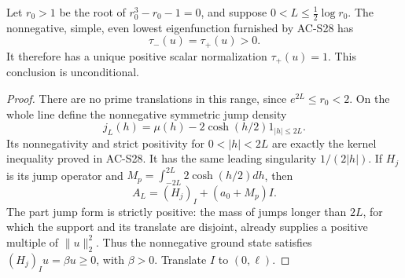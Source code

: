 \begin{proposition}
\label{AC-S38}
Let \(r_0>1\) be the root of \(r_0^3-r_0-1=0\), and suppose
\(0<L\leq\tfrac12\log r_0\).
The nonnegative, simple, even lowest eigenfunction furnished by AC-S28
has
\[
                         \tau_-(u)=\tau_+(u)>0.
                                                        \tag{RN.17}
\]
It therefore has a unique positive scalar normalization
\(\tau_+(u)=1\).  This conclusion is unconditional.
\end{proposition}
\begin{proof}
There are no prime translations in this range, since
\(e^{2L}\leq r_0<2\).  On the whole line define the nonnegative
symmetric jump density
\[
 j_L(h)=\mu(h)-2\cosh(h/2)1_{|h|\leq2L}.
                                                        \tag{RN.18}
\]
Its nonnegativity and strict positivity for \(0<|h|<2L\)
are exactly the kernel inequality proved in AC-S28.
It has the same leading singularity \(1/(2|h|)\).
If \(H_j\) is its jump operator and
\(M_p=\int_{-2L}^{2L}2\cosh(h/2)dh\), then
\[
                         A_L=(H_j)_I+(a_0+M_p)I.
                                                        \tag{RN.19}
\]
The part jump form is strictly positive: the mass of jumps longer
than \(2L\), for which the support and its translate are disjoint,
already supplies a positive multiple of \(\|u\|_2^2\).
Thus the nonnegative ground state satisfies
\((H_j)_Iu=\beta u\geq0\), with \(\beta>0\).
Translate \(I\) to \((0,\ell)\).


\end{proof}

